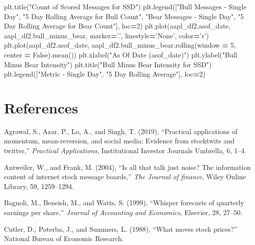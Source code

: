 \documentclass[11,]{article}
\newenvironment{Shaded}{\begin{snugshade}}{\end{snugshade}}
\newcommand{\DecValTok}[1]{\textcolor[rgb]{0.00,0.00,0.81}{#1}}
\newcommand{\NormalTok}[1]{#1}
\newcommand{\OperatorTok}[1]{\textcolor[rgb]{0.81,0.36,0.00}{\textbf{#1}}}
\newcommand{\StringTok}[1]{\textcolor[rgb]{0.31,0.60,0.02}{#1}}
\newcommand{\VariableTok}[1]{\textcolor[rgb]{0.00,0.00,0.00}{#1}}
\begin{document}
\begin{Shaded}
\begin{Highlighting}[]
\NormalTok{plt.title(}\StringTok{"Count of Scored Messages for SSD"}\NormalTok{)}
\NormalTok{plt.legend([}\StringTok{"Bull Messages - Single Day"}\NormalTok{, }\StringTok{"5 Day Rolling Average for Bull Count"}\NormalTok{, }\StringTok{"Bear Messages - Single Day"}\NormalTok{, }\StringTok{"5 Day Rolling Average for Bear Count"}\NormalTok{], loc}\OperatorTok{=}\DecValTok{2}\NormalTok{)}
\NormalTok{plt.plot(aapl_df2.asof_date, aapl_df2.bull_minus_bear, marker}\OperatorTok{=}\StringTok{'.'}\NormalTok{, linestyle}\OperatorTok{=}\StringTok{'None'}\NormalTok{, color}\OperatorTok{=}\StringTok{'r'}\NormalTok{)}
\NormalTok{plt.plot(aapl_df2.asof_date, aapl_df2.bull_minus_bear.rolling(window }\OperatorTok{=} \DecValTok{5}\NormalTok{, center }\OperatorTok{=} \VariableTok{False}\NormalTok{).mean())}
\NormalTok{plt.xlabel(}\StringTok{"As Of Date (asof_date)"}\NormalTok{)}
\NormalTok{plt.ylabel(}\StringTok{"Bull Minus Bear Intensity"}\NormalTok{)}
\NormalTok{plt.title(}\StringTok{"Bull Minus Bear Intensity for SSD"}\NormalTok{)}
\NormalTok{plt.legend([}\StringTok{"Metric - Single Day"}\NormalTok{, }\StringTok{"5 Day Rolling Average"}\NormalTok{], loc}\OperatorTok{=}\DecValTok{2}\NormalTok{)}
\end{Highlighting}
\end{Shaded}

\hypertarget{references}{%
\section*{References}\label{references}}

\hypertarget{refs}{}
\leavevmode\hypertarget{ref-agrawal2019}{}%
Agrawal, S., Azar, P., Lo, A., and Singh, T. (2019), ``Practical
applications of momentum, mean-reversion, and social media: Evidence
from stocktwits and twitter,'' \emph{Practical Applications},
Institutional Investor Journals Umbrella, 6, 1--4.

\leavevmode\hypertarget{ref-antweiler2004}{}%
Antweiler, W., and Frank, M. (2004), ``Is all that talk just noise? The
information content of internet stock message boards,'' \emph{The
Journal of finance}, Wiley Online Library, 59, 1259--1294.

\leavevmode\hypertarget{ref-bagnoli1999}{}%
Bagnoli, M., Beneish, M., and Watts, S. (1999), ``Whisper forecasts of
quarterly earnings per share,'' \emph{Journal of Accounting and
Economics}, Elsevier, 28, 27--50.

\leavevmode\hypertarget{ref-cutler1988}{}%
Cutler, D., Poterba, J., and Summers, L. (1988), ``What moves stock
prices?'' National Bureau of Economic Research.
\end{document}

